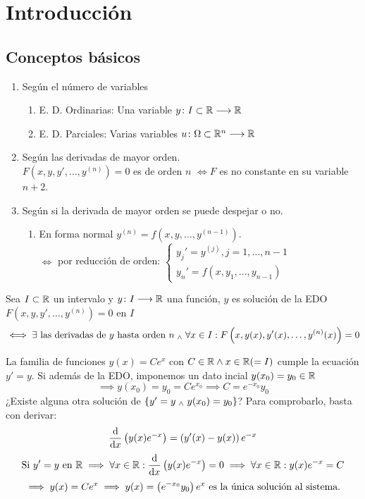 \section{Introducción}
\subsection{Conceptos básicos}
\begin{defn}
	\item[] 
	\begin{enumerate}[topsep=1pt, itemsep=1pt,parsep=3pt]
		\item Según el número de variables
		\begin{enumerate}[topsep=1pt, itemsep=1pt,parsep=3pt]
			\item E. D. Ordinarias: Una variable $y \colon I\subset \mathbb{R} \longrightarrow \mathbb{R}$
			\item E. D. Parciales: Varias variables $u \colon \Omega \subset \mathbb{R}^{n} \longrightarrow \mathbb{R}$
		\end{enumerate}
		\item Según las derivadas de mayor orden. \\$F\left(x,y,y', \dots, y^{(n)}\right)=0$ es de orden $n$ \(\iff F\) es no constante en su variable $n+2$.
		\item Según si la derivada de mayor orden se puede despejar o no.
		\begin{enumerate}[topsep=1pt, itemsep=1pt,parsep=3pt]
			\item En forma normal $y^{(n)} = f(x, y, \dots, y^{(n-1)})$.
			\\ $\iff$ por reducción de orden:
			$\begin{cases}
				y_j' = y^{(j)}, j=1, \dots, n-1\\
				y_n'=f(x,y_1, \dots, y_{n-1})
			\end{cases}$
		\end{enumerate}
	\end{enumerate}    
\end{defn}
\begin{defn}
	Sea $I\subset \mathbb{R}$ un intervalo y $y \colon I \longrightarrow \mathbb{R}$ una función, $y$ es solución de la EDO $F\left(x,y,y', \dots, y^{(n)}\right)=0$ en $I$
	\[\iff \exists \text{ las derivadas de } y \text{ hasta orden } n \; _{\wedge} \; \forall x \in I : F\left(x,y(x),y'(x), \dots, y^{(n)}(x)\right)=0\]
\end{defn}
\begin{ejem}
	La familia de funciones $y(x)=Ce^x$ con $C\in \mathbb{R} \wedge x\in \mathbb{R} (=I)$ cumple la ecuación $y'=y$. Si además de la EDO, imponemos un dato incial $y(x_0)=y_0 \in \mathbb{R}$
	\[\implies y(x_0)=y_0=Ce^{x_0} \implies C=e^{-x_0}y_0\]
	¿Existe alguna otra solución de $\{y'=y \; _{\wedge} \; y(x_0)=y_0\}$?
	Para comprobarlo, basta con derivar:
	\[\odv{}{x}\left(y(x)e^{-x}\right)=\left(y'(x) - y(x)\right)e^{-x}\]
	\[\tex{Si } y'=y \tex{ en } \R \implies \forall x \in \R : \odv{}{x}\left(y(x)e^{-x}\right)=0 \implies \forall x \in \R : y(x)e^{-x} = C\]
	\[\implies y(x)=Ce^x \implies y(x)=\left(e^{-x_0}y_0\right)e^x \text{ es la única solución al sistema.}\]
\end{ejem}

